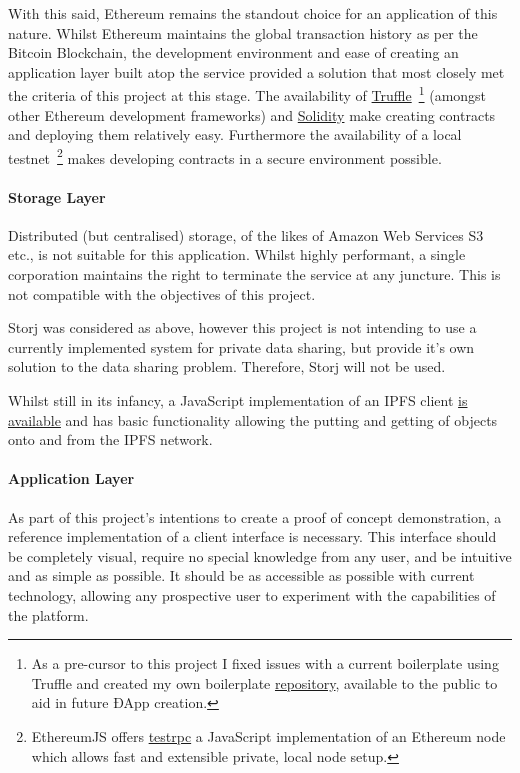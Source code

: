 With this said, Ethereum remains the standout choice for an application of this nature. Whilst Ethereum maintains the global transaction history as per the Bitcoin Blockchain, the development environment and ease of creating an application layer built atop the service provided a solution that most closely met the criteria of this project at this stage. The availability of \href{https://github.com/trufflesuite/truffle}{Truffle}~\footnote{As a pre-cursor to this project I fixed issues with a current boilerplate using Truffle and created my own boilerplate \href{https://github.com/FreddieLindsey/truffle-webpack-boilerplate}{repository}, available to the public to aid in future ÐApp creation.} (amongst other Ethereum development frameworks) and \href{https://github.com/ethereum/solidity}{Solidity} make creating contracts and deploying them relatively easy. Furthermore the availability of a local testnet~\footnote{EthereumJS offers \href{https://github.com/ethereumjs/testrpc}{testrpc} a JavaScript implementation of an Ethereum node which allows fast and extensible private, local node setup.} makes developing contracts in a secure environment possible.

\paragraph{Storage Layer}

Distributed (but centralised) storage, of the likes of Amazon Web Services S3 etc., is not suitable for this application. Whilst highly performant, a single corporation maintains the right to terminate the service at any juncture. This is not compatible with the objectives of this project.

Storj was considered as above, however this project is not intending to use a currently implemented system for private data sharing, but provide it's own solution to the data sharing problem. Therefore, Storj will not be used.

Whilst still in its infancy, a JavaScript implementation of an IPFS client \href{https://github.com/ipfs/js-ipfs}{is available} and has basic functionality allowing the putting and getting of objects onto and from the IPFS network.

\paragraph{Application Layer}

As part of this project's intentions to create a proof of concept demonstration, a reference implementation of a client interface is necessary. This interface should be completely visual, require no special knowledge from any user, and be intuitive and as simple as possible. It should be as accessible as possible with current technology, allowing any prospective user to experiment with the capabilities of the platform.

